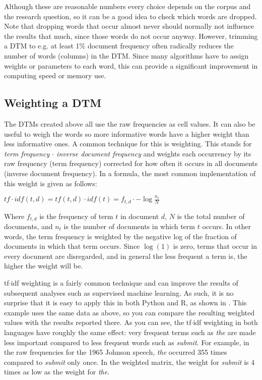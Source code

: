 Although these are reasonable numbers every choice depends on the corpus and the research question, so it can be a good idea to check which words are dropped.
Note that dropping words that occur almost never should normally not influence the results that much, since those words do not occur anyway.
However, trimming a DTM to e.g. at least 1\% document frequency often radically reduces the number of words (columns) in the DTM.
Since many algorithms have to assign weights or parameters to each word, this can provide a significant improvement in computing speed or memory use. 

\subsection{Weighting a DTM}

The DTMs created above all use the raw frequencies as cell values.
It can also be useful to weigh the words so more informative words have a higher weight than less informative ones.
A common technique for this is  weighting.
This stands for \emph{term frequency $\cdot$ inverse document frequency} and weights each occurrency by its raw frequency (term frequency) corrected for how often it occurs in all documents (inverse document frequency). In a formula, the most common implementation of this weight is given as follows:

$tf\cdot idf(t,d)=tf(t,d)\cdot idf(t)=f_{t,d}\cdot -\log \frac{n_t}{N}$

Where $f_{t,d}$ is the frequency of term $t$ in document $d$, $N$ is the total number of documents, and $n_t$ is the number of documents in which term $t$ occurs. In other words, the term frequency is weighted by the negative log of the fraction of documents in which that term occurs. Since $\log(1)$ is zero, terms that occur in every document are disregarded, and in general the less frequent a term is, the higher the weight will be. 



tf$\cdot$idf weighting is a fairly common technique and can improve the results of subsequent analyses such as supervised machine learning.
As such, it is no surprise that it is easy to apply this in both Python and R, as shown in .
This example uses the same data as  above, so you can compare the resulting weighted values with the results reported there.
As you can see, the tf$\cdot$idf weighting in both languages have roughly the same effect:
very frequent terms such as \emph{the} are made less important compared to less frequent words such as \emph{submit}.
For example, in the raw frequencies for the 1965 Johnson speech, \emph{the} occurred 355 times compared to \emph{submit} only once.
In the weighted matrix, the weight for \emph{submit} is 4 times as low as the weight for \emph{the}.

